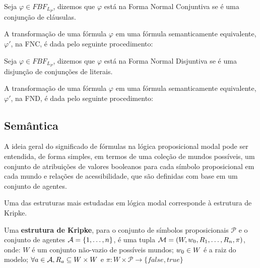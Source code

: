 
\begin{definition}
    Seja $\varphi \in FBF_{L_P}$, dizemos que $\varphi$ está na Forma Normal
    Conjuntiva se é uma conjunção de cláusulas.
\end{definition}

A transformação de uma fórmula $\varphi$ em uma fórmula semanticamente
equivalente, $\varphi '$, na FNC, é dada pelo seguinte procedimento:

\begin{definition}
    Seja $\varphi \in FBF_{L_P}$, dizemos que $\varphi$ está na Forma Normal
    Disjuntiva se é uma disjunção de conjunções de literais.
\end{definition}

A transformação de uma fórmula $\varphi$ em uma fórmula semanticamente
equivalente, $\varphi '$, na FND, é dada pelo seguinte procedimento:


\subsection{Semântica}
\label{semantics}

A ideia geral do significado de fórmulas na lógica proposicional modal pode ser
entendida, de forma simples, em termos de uma coleção de mundos possíveis, um conjunto
de atribuições de valores booleanos para cada símbolo proposicional em cada
mundo e relações de acessibilidade, que são definidas com base em um conjunto de
agentes.

Uma das estruturas mais estudadas em lógica modal corresponde à estrutura de
Kripke. 

\begin{definition}
    Uma \textbf{estrutura de Kripke}, para o conjunto de símbolos proposicionais
    $\mathcal{P}$ e o conjunto de agentes ${\cal{A}} = \{1,\ldots, n\}$, é
    uma tupla $\mathcal{M} = (W, w_0, R_1,\ldots, R_n, \pi)$, onde:
   $W$ é um conjunto não-vazio de possíveis mundos; $w_0 \in W$ é a raiz do modelo; 
   $\forall a \in {\cal{A}}, R_{a} \subseteq W \times W$ e
   $\pi : W \times \mathcal{P} \longrightarrow \{false, true\}$
    
\end{definition}

